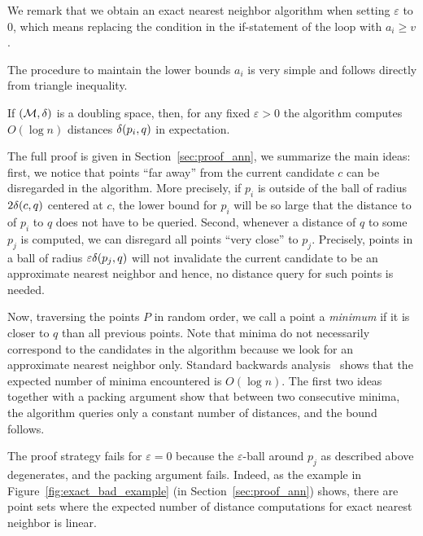 \documentclass{ws-ijcga}
\renewcommand{\geq}{\geqslant}
\newcommand{\eps}{\varepsilon}
\begin{document}
We remark that we obtain an exact nearest neighbor algorithm
when setting $\eps$ to $0$, which means 
replacing the condition in the if-statement of the loop
with $a_i\geq v$.

The procedure to maintain the lower bounds $a_i$
is very simple and follows directly
from triangle inequality.

\begin{algorithmic}
    \EndFor
\EndProcedure
\end{algorithmic}

\begin{theorem}
\label{thm:ann_bound}
    If $(\mathcal{M}, \delta)$ is a doubling space, then, for any fixed $\eps > 0$ the
    algorithm computes $O(\log n)$ distances $\delta(p_i, q)$ in expectation.
\end{theorem}

The full proof is given in Section~\ref{sec:proof_ann},
we summarize the main ideas:
first, we notice that points ``far away'' from the current candidate $c$ 
can be disregarded in the algorithm. More precisely, if $p_i$
is outside of the ball of radius $2\delta(c, q)$ centered at $c$,
the lower bound for $p_i$ will be so large that
the distance to of $p_i$ to $q$ does not have to be queried.
Second, whenever a distance of $q$ to some $p_j$ is computed,
we can disregard all points ``very close'' to $p_j$.
Precisely, points in a ball of radius $\eps\dist(p_j,q)$
will not invalidate the current candidate 
to be an approximate nearest neighbor and hence,
no distance query for such points is needed.

Now, traversing the points $P$ in random order,
we call a point a \emph{minimum} if it is closer to $q$
than all previous points. Note that minima do not necessarily
correspond to the candidates in the algorithm because
we look for an approximate nearest neighbor only.
Standard backwards analysis~\cite{seidel-backwards}
shows that the expected number of minima encountered is $O(\log n)$.
The first two ideas together with a packing argument show
that between two consecutive minima, 
the algorithm queries only a constant number of distances,
and the bound follows.

The proof strategy fails for $\eps=0$ because the $\eps$-ball
around $p_j$ as described above degenerates, and the packing argument fails.
Indeed, as the example in Figure~\ref{fig:exact_bad_example} (in Section~\ref{sec:proof_ann}) 
shows, there are point sets where the expected number
of distance computations for exact nearest neighbor is linear.
\end{document}
